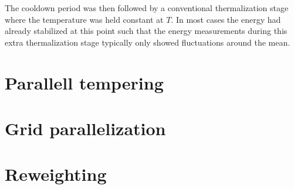 The cooldown period was then followed by a conventional thermalization stage where the temperature was held constant at $T$. In
most cases the energy had already stabilized at this point such that the energy measurements during this extra thermalization
stage typically only showed fluctuations around the mean.


\section{Parallell tempering}

\section{Grid parallelization}

\section{Reweighting}
